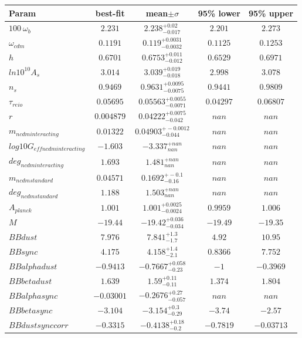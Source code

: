 \begin{tabular}{|l|c|c|c|c|} 
 \hline 
Param & best-fit & mean$\pm\sigma$ & 95\% lower & 95\% upper \\ \hline 
$100~\omega{}_{b }$ &$2.231$ & $2.238_{-0.017}^{+0.02}$ & $2.201$ & $2.273$ \\ 
$\omega{}_{cdm }$ &$0.1191$ & $0.119_{-0.0032}^{+0.0031}$ & $0.1125$ & $0.1253$ \\ 
$h$ &$0.6701$ & $0.6753_{-0.012}^{+0.011}$ & $0.6529$ & $0.6971$ \\ 
$ln10^{10}A_{s }$ &$3.014$ & $3.039_{-0.018}^{+0.019}$ & $2.998$ & $3.078$ \\ 
$n_{s }$ &$0.9469$ & $0.9631_{-0.0075}^{+0.0095}$ & $0.9441$ & $0.9809$ \\ 
$\tau{}_{reio }$ &$0.05695$ & $0.05563_{-0.0071}^{+0.0055}$ & $0.04297$ & $0.06807$ \\ 
$r$ &$0.004879$ & $0.04222_{-0.042}^{+0.0075}$ & $nan$ & $nan$ \\ 
$m_{ncdm interacting }$ &$0.01322$ & $0.04903_{-0.044}^{+-0.0012}$ & $nan$ & $nan$ \\ 
$log10G_{eff ncdm interacting }$ &$-1.603$ & $-3.337_{nan}^{+nan}$ & $nan$ & $nan$ \\ 
$deg_{ncdm interacting }$ &$1.693$ & $1.481_{nan}^{+nan}$ & $nan$ & $nan$ \\ 
$m_{ncdm standard }$ &$0.04571$ & $0.1692_{-0.16}^{+-0.1}$ & $nan$ & $nan$ \\ 
$deg_{ncdm standard }$ &$1.188$ & $1.503_{nan}^{+nan}$ & $nan$ & $nan$ \\ 
$A_{planck }$ &$1.001$ & $1.001_{-0.0024}^{+0.0025}$ & $0.9959$ & $1.006$ \\ 
$M$ &$-19.44$ & $-19.42_{-0.034}^{+0.036}$ & $-19.49$ & $-19.35$ \\ 
$BBdust$ &$7.976$ & $7.841_{-1.7}^{+1.3}$ & $4.92$ & $10.95$ \\ 
$BBsync$ &$4.175$ & $4.158_{-2.1}^{+1.4}$ & $0.8366$ & $7.752$ \\ 
$BBalphadust$ &$-0.9413$ & $-0.7667_{-0.23}^{+0.058}$ & $-1$ & $-0.3969$ \\ 
$BBbetadust$ &$1.639$ & $1.59_{-0.11}^{+0.11}$ & $1.374$ & $1.804$ \\ 
$BBalphasync$ &$-0.03001$ & $-0.2676_{-0.057}^{+0.27}$ & $nan$ & $nan$ \\ 
$BBbetasync$ &$-3.104$ & $-3.154_{-0.29}^{+0.3}$ & $-3.74$ & $-2.57$ \\ 
$BBdustsynccorr$ &$-0.3315$ & $-0.4138_{-0.2}^{+0.18}$ & $-0.7819$ & $-0.03713$ \\ 

\end{tabular}
